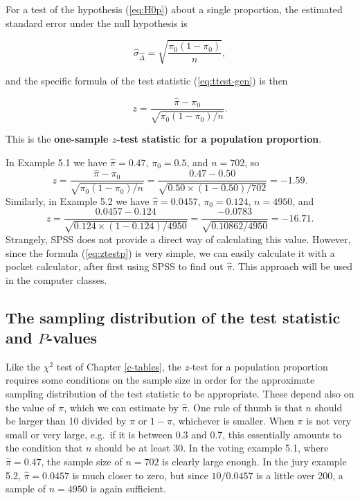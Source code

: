 \documentclass[11pt,a4paper,openany]{book}
\begin{document}
For a test of the hypothesis (\ref{eq:H0p}) about a single proportion,
the estimated standard error under the null hypothesis is

\begin{equation}\hat{\sigma}_{\hat{\Delta}} = \sqrt{\frac{\pi_{0}(1-\pi_{0})}{n}},
\label{eq:seDhatp}\end{equation}

and the specific formula of the test statistic (\ref{eq:ttest-gen}) is
then

\begin{equation}z=\frac{\hat{\pi}-\pi_{0}}
{\sqrt{\pi_{0}(1-\pi_{0})/n}}.
\label{eq:ztestp}\end{equation}

This is the \textbf{one-sample \(z\)-test statistic for a population
proportion}.

In Example 5.1 we have \(\hat{\pi}=0.47\), \(\pi_{0}=0.5\), and
\(n=702\), so \[z=\frac{\hat{\pi}-\pi_{0}}{\sqrt{\pi_{0}(1-\pi_{0})/n}}=
\frac{0.47-0.50}{\sqrt{0.50\times(1-0.50)/702}}=-1.59.\] Similarly, in
Example 5.2 we have \(\hat{\pi}=0.0457\), \(\pi_{0}=0.124\), \(n=4950\),
and \[z=\frac{0.0457-0.124}{\sqrt{0.124\times(1-0.124)/4950}}
=
\frac{-0.0783}{\sqrt{0.10862/4950}}=-16.71.\] Strangely, SPSS does not
provide a direct way of calculating this value. However, since the
formula (\ref{eq:ztestp}) is very simple, we can easily calculate it
with a pocket calculator, after first using SPSS to find out
\(\hat{\pi}\). This approach will be used in the computer classes.

\subsection{\texorpdfstring{The sampling distribution of the test
statistic and
\(P\)-values}{The sampling distribution of the test statistic and P-values}}\label{ss-probs-test1sample-samplingd}

Like the \(\chi^{2}\) test of Chapter \ref{c-tables}, the \(z\)-test for
a population proportion requires some conditions on the sample size in
order for the approximate sampling distribution of the test statistic to
be appropriate. These depend also on the value of \(\pi\), which we can
estimate by \(\hat{\pi}\). One rule of thumb is that \(n\) should be
larger than 10 divided by \(\pi\) or \(1-\pi\), whichever is smaller.
When \(\pi\) is not very small or very large, e.g.~if it is between 0.3
and 0.7, this essentially amounts to the condition that \(n\) should be
at least 30. In the voting example 5.1, where \(\hat{\pi}=0.47\), the
sample size of \(n=702\) is clearly large enough. In the jury example
5.2, \(\hat{\pi}=0.0457\) is much closer to zero, but since
\(10/0.0457\) is a little over 200, a sample of \(n=4950\) is again
sufficient.
\end{document}
